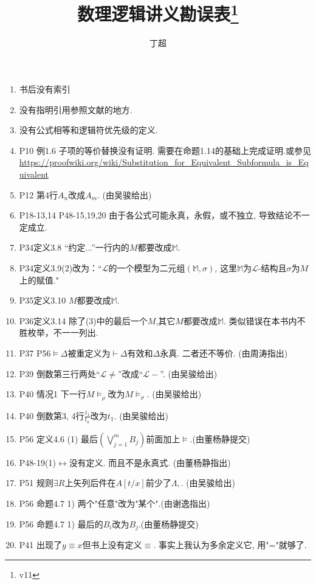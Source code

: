 \documentclass{article}
\begin{document}
\title{数理逻辑讲义勘误表\footnote{v11}}
\author{丁超}
\maketitle	
\begin{enumerate}
\item 书后没有索引
\item 没有指明引用参照文献的地方.
\item 没有公式相等和逻辑符优先级的定义. 
\item P10 例1.6 子项的等价替换没有证明. 需要在命题1.14的基础上完成证明.或参见\\ \url{https://proofwiki.org/wiki/Substitution_for_Equivalent_Subformula_is_Equivalent}
\item P12 第4行$A_n$改成$A_m$. (由吴骏给出)
\item P18-13,14 P48-15,19,20 由于各公式可能永真，永假，或不独立, 导致结论不一定成立. 
\item P34定义3.8 “约定...”一行内的$M$都要改成$\mathbb{M}$. 
\item P34定义3.9(2)改为：“$\mathscr{L}$的一个模型为二元组$(\mathbb{M},\sigma)$, 这里$\mathbb{M}$为$\mathscr{L}$-结构且$\sigma$为$M$上的赋值."
\item P35定义3.10 $M$都要改成$\mathbb{M}$. 
\item P36定义3.14 除了(3)中的最后一个$M$,其它$M$都要改成$\mathbb{M}$. 类似错误在本书内不胜枚举，不一一列出. 
\item P37 P56$\models \Delta$被重定义为$\vdash \Delta$有效和$\Delta$永真. 二者还不等价. (由周涛指出)
\item P39 倒数第三行两处``$\mathscr{L}\ne$''改成``$\mathscr{L}-$''. (由吴骏给出)
\item P40 情况1 下一行$M\models_\rho$改为$M\models_\sigma$. (由吴骏给出)
\item P40 倒数第3, 4行$\frac{t_1}{t_n}$改为$t_1$. (由吴骏给出)\item P56 定义4.6 (1) 最后\((\bigvee\limits_{j=1}^m B_j)\)前面加上\(\models\).(由董杨静提交)
\item P48-19(1)$\leftrightarrow$没有定义. 而且不是永真式. (由董杨静指出)
\item P51 规则$\exists R$上矢列后件在$A[t/x]$前少了$\Lambda, $. (由吴骏给出)
\item P56 命题4.7 1) 两个"任意"改为"某个".(由谢逸指出)
\item P56 命题4.7 1) 最后的\(B_i\)改为\(B_j\).(由董杨静提交)
\item P41 出现了$y\equiv x$但书上没有定义$\equiv$. 事实上我认为多余定义它, 用"="就够了. 

\end{enumerate}
\end{document}
